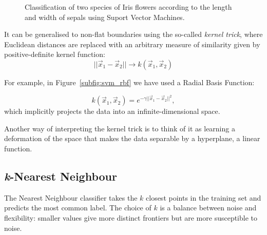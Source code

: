 \begin{figure}
\centering
{}%
\hfill
{}%
\caption{Classification of two species of Iris flowers according to the length and width of sepals using Suport Vector Machines.}\label{fig:svm}
\end{figure}

It can be generalised  to non-flat boundaries using the so-called \emph{kernel trick}, where Euclidean distances are replaced with an arbitrary measure of similarity given by positive-definite kernel function:
\[||\vec{x}_1 - \vec{x}_2|| \rightarrow k(\vec{x}_1, \vec{x}_2)\]

For example, in Figure~\ref{subfig:svm_rbf} we have used a Radial Basis Function:

\[k(\vec{x}_1, \vec{x}_2) = e^{-\gamma ||\vec{x}_1 - \vec{x}_2||^2 },\]
which implicitly projects the data into an infinite-dimensional space.

Another way of interpreting the kernel trick is to think of it as learning a deformation of the space that makes the data separable by a hyperplane, a linear function.

\subsection{\emph{k}-Nearest Neighbour}
The Nearest Neighbour classifier takes the $k$ closest points in the training set and predicts the most common label.
The choice of $k$ is a balance between noise and flexibility: smaller values give more distinct frontiers but are more susceptible to noise.

